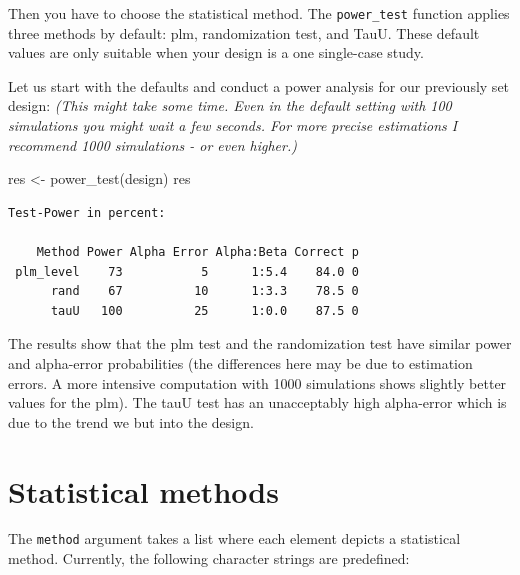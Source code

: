 \documentclass[
]{book}
\newenvironment{Shaded}{\begin{snugshade}}{\end{snugshade}}
\newcommand{\FunctionTok}[1]{\textcolor[rgb]{0.00,0.00,0.00}{#1}}
\newcommand{\NormalTok}[1]{#1}
\newcommand{\OtherTok}[1]{\textcolor[rgb]{0.56,0.35,0.01}{#1}}
\begin{document}
Then you have to choose the statistical method. The \texttt{power\_test} function applies three methods by default: plm, randomization test, and TauU.
These default values are only suitable when your design is a one single-case study.

Let us start with the defaults and conduct a power analysis for our previously set design: \emph{(This might take some time. Even in the default setting with 100 simulations you might wait a few seconds. For more precise estimations I recommend 1000 simulations - or even higher.)}

\begin{Shaded}
\begin{Highlighting}[]
\NormalTok{res }\OtherTok{\textless{}{-}} \FunctionTok{power\_test}\NormalTok{(design)}
\NormalTok{res}
\end{Highlighting}
\end{Shaded}

\begin{verbatim}
Test-Power in percent:

    Method Power Alpha Error Alpha:Beta Correct p
 plm_level    73           5      1:5.4    84.0 0
      rand    67          10      1:3.3    78.5 0
      tauU   100          25      1:0.0    87.5 0
\end{verbatim}

The results show that the plm test and the randomization test have similar power and alpha-error probabilities (the differences here may be due to estimation errors. A more intensive computation with 1000 simulations shows slightly better values for the plm). The tauU test has an unacceptably high alpha-error which is due to the trend we but into the design.

\hypertarget{statistical-methods}{%
\section{Statistical methods}\label{statistical-methods}}

The \texttt{method} argument takes a list where each element depicts a statistical method. Currently, the following character strings are predefined:
\end{document}
